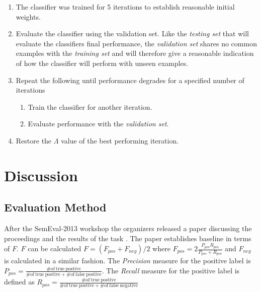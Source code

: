 \documentclass[12pt]{article}
\begin{document}
\begin{enumerate}

    \item The classifier was trained for 5 iterations to establish reasonable
        initial weights.

    \item Evaluate the classifier using the validation set. Like the
        \textit{testing set} that will evaluate the classifiers final
        performance, the \textit{validation set} shares no common examples with
        the \textit{training set} and will therefore give a reasonable
        indication of how the classifier will perform with unseen examples.

    \item Repeat the following until performance degrades for a specified
        number of iterations

    \begin{enumerate}

        \item Train the classifier for another iteration.

        \item Evaluate performance with the \textit{validation set}.

    \end{enumerate}

    \item Restore the $\Lambda$ value of the best performing iteration.

\end{enumerate}

\section{Discussion}

\subsection{Evaluation Method}

After the SemEval-2013 workshop the organizers released a paper discussing the
proceedings and the results of the task \cite{Nakov2013}. The paper establishes
baseline in terms of $F$. $F$ can be calculated $F = (F_{pos} + F_{neg}) / 2$
where $F_{pos} = 2 \frac{P_{pos}R_{pos}}{P_{pos} + R_{pos}}$ and $F_{neg}$ is
calculated in a similar fashion. The \textit{Precision} measure for the
positive label is $P_{pos} = \frac{\mathrm{\# of\ true\ postive}}{\mathrm{\#
of\ true\ postive} + \mathrm{\# of\ false\ postive} }$. The \textit{Recall}
measure for the positive label is defined as $R_{pos} = \frac{\mathrm{\# of\
true\ postive}}{\mathrm{\# of\ true\ postive} + \mathrm{\# of\ false\ negative}
}$
\end{document}
